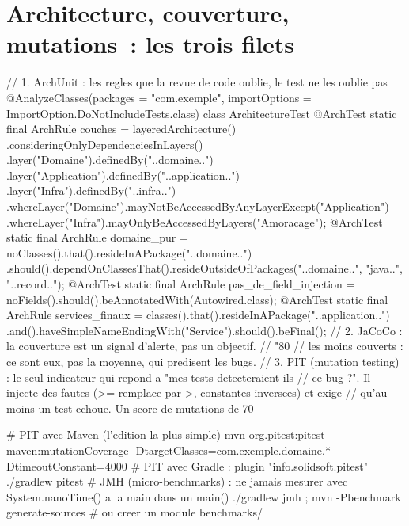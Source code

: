 \documentclass[12pt,a4paper,twoside,openright]{book}
\begin{document}
\section{Architecture, couverture, mutations~: les trois filets}

\begin{codejava}
// 1. ArchUnit : les regles que la revue de code oublie, le test ne les oublie pas
@AnalyzeClasses(packages = "com.exemple", importOptions = ImportOption.DoNotIncludeTests.class)
class ArchitectureTest {
    @ArchTest static final ArchRule couches = layeredArchitecture()
            .consideringOnlyDependenciesInLayers()
            .layer("Domaine").definedBy("..domaine..")
            .layer("Application").definedBy("..application..")
            .layer("Infra").definedBy("..infra..")
            .whereLayer("Domaine").mayNotBeAccessedByAnyLayerExcept("Application")
            .whereLayer("Infra").mayOnlyBeAccessedByLayers("Amoracage");
    @ArchTest static final ArchRule domaine_pur = noClasses().that().resideInAPackage("..domaine..")
            .should().dependOnClassesThat().resideOutsideOfPackages("..domaine..", "java..", "..record..");
    @ArchTest static final ArchRule pas_de_field_injection =
            noFields().should().beAnnotatedWith(Autowired.class);
    @ArchTest static final ArchRule services_finaux = classes().that().resideInAPackage("..application..")
            .and().haveSimpleNameEndingWith("Service").should().beFinal();
}
// 2. JaCoCo : la couverture est un signal d'alerte, pas un objectif.
//    "80 %
//    les moins couverts : ce sont eux, pas la moyenne, qui predisent les bugs.
// 3. PIT (mutation testing) : le seul indicateur qui repond a "mes tests detecteraient-ils
//    ce bug ?". Il injecte des fautes (>= remplace par >, constantes inversees) et exige
//    qu'au moins un test echoue. Un score de mutations de 70 %
\end{codejava}

\begin{terminal}
# PIT avec Maven (l'edition la plus simple)
mvn org.pitest:pitest-maven:mutationCoverage -DtargetClasses=com.exemple.domaine.* -DtimeoutConstant=4000
# PIT avec Gradle : plugin "info.solidsoft.pitest"
./gradlew pitest
# JMH (micro-benchmarks) : ne jamais mesurer avec System.nanoTime() a la main dans un main()
./gradlew jmh ; mvn -Pbenchmark generate-sources  # ou creer un module benchmarks/
\end{terminal}
\end{document}

